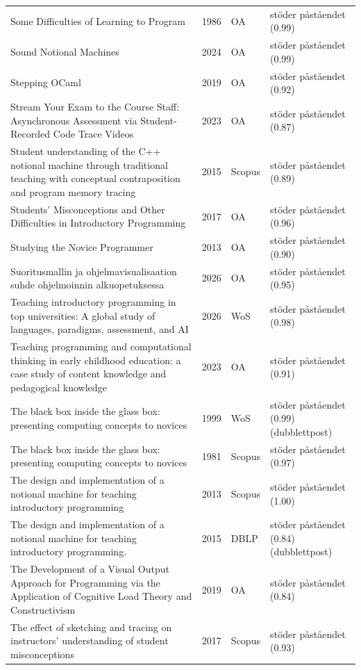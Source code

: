 \begin{longtable}{@{}%
  >{\raggedright\arraybackslash}p{}c%
  >{\raggedright\arraybackslash}p{}%
  >{\raggedright\arraybackslash}p{}@{}}
Some Difficulties of Learning to Program & 1986 & OA & stöder påståendet (0.99) \\
Sound Notional Machines & 2024 & OA & stöder påståendet (0.99) \\
Stepping OCaml & 2019 & OA & stöder påståendet (0.92) \\
Stream Your Exam to the Course Staff: Asynchronous Assessment via Student-Recorded Code Trace Videos & 2023 & OA & stöder påståendet (0.87) \\
Student understanding of the C++ notional machine through traditional teaching with conceptual contraposition and program memory tracing & 2015 & Scopus & stöder påståendet (0.89) \\
Students' Misconceptions and Other Difficulties in Introductory Programming & 2017 & OA & stöder påståendet (0.96) \\
Studying the Novice Programmer & 2013 & OA & stöder påståendet (0.90) \\
Suoritusmallin ja ohjelmavisualisaation suhde ohjelmoinnin alkuopetuksessa & 2026 & OA & stöder påståendet (0.95) \\
Teaching introductory programming in top universities: A global study of languages, paradigms, assessment, and AI & 2026 & WoS & stöder påståendet (0.98) \\
Teaching programming and computational thinking in early childhood education: a case study of content knowledge and pedagogical knowledge & 2023 & OA & stöder påståendet (0.91) \\
The black box inside the glass box: presenting computing concepts to novices & 1999 & WoS & stöder påståendet (0.99) (dubblettpost) \\
The black box inside the glass box: presenting computing concepts to novices & 1981 & Scopus & stöder påståendet (0.97) \\
The design and implementation of a notional machine for teaching introductory programming & 2013 & Scopus & stöder påståendet (1.00) \\
The design and implementation of a notional machine for teaching introductory programming. & 2015 & DBLP & stöder påståendet (0.84) (dubblettpost) \\
The Development of a Visual Output Approach for Programming via the Application of Cognitive Load Theory and Constructivism & 2019 & OA & stöder påståendet (0.84) \\
The effect of sketching and tracing on instructors' understanding of student misconceptions & 2017 & Scopus & stöder påståendet (0.93) \\

\end{longtable}
